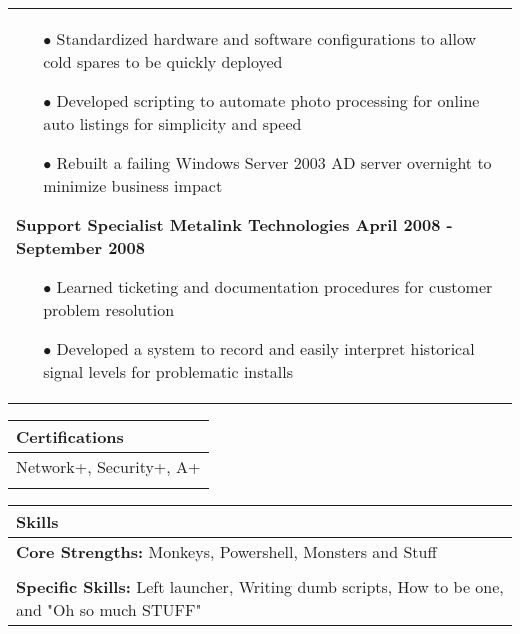 \documentclass{article}
\begin{document}
\begin{tabular}{p{\dimexpr\linewidth-2\tabcolsep}}
 \begin{itemize}
	\item[$\bullet$]Standardized hardware and software configurations to allow cold spares to be quickly deployed
	\item[$\bullet$]Developed scripting to automate photo processing for online auto listings for simplicity and speed
	\item[$\bullet$]Rebuilt a failing Windows Server 2003 AD server overnight to minimize business impact
 \end{itemize}
   {\bfseries Support Specialist \hfill Metalink Technologies \quad \qquad April 2008 - September 2008}
 \begin{itemize}
 	\item[$\bullet$]Learned ticketing and documentation procedures for customer problem resolution
 	\item[$\bullet$]Developed a system to record and easily interpret historical signal levels for problematic installs
 \end{itemize}
\end{tabular}
\begin{tabular}{p{\dimexpr\linewidth-2\tabcolsep}}
	\textbf{Certifications} \\
	\hline
	\textnormal{Network+, Security+, A+} \\
	\\
\end{tabular}
\begin{tabular}{p{\dimexpr\linewidth-2\tabcolsep}}
	\textbf{Skills} \\
	\hline
	\textbf{Core Strengths:} \textnormal{Monkeys, Powershell, Monsters and Stuff} \\
	\\
	\textbf{Specific Skills:} \textnormal{Left launcher, Writing dumb scripts, How to be one, and "Oh so much STUFF"}
\end{tabular}
\end{document}
